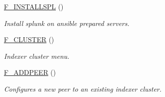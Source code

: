 \begin{DoxyCompactItemize}
\mbox{\hyperlink{ansible__engine_8sh_a9568fd1ead2b71b897b08920e10845a5}{F\+\_\+\+I\+N\+S\+T\+A\+L\+L\+S\+PL}} ()
\begin{DoxyCompactList}\small\item\em Install splunk on ansible prepared servers. \end{DoxyCompactList}\item 
\mbox{\hyperlink{ansible__engine_8sh_a404f494374c78e96b2638ab4b727a158}{F\+\_\+\+C\+L\+U\+S\+T\+ER}} ()
\begin{DoxyCompactList}\small\item\em Indexer cluster menu. \end{DoxyCompactList}\item 
\mbox{\hyperlink{ansible__engine_8sh_ad8cc58f72a5560d0ae9e41b78ac63baf}{F\+\_\+\+A\+D\+D\+P\+E\+ER}} ()
\begin{DoxyCompactList}\small\item\em Configures a new peer to an existing indexer cluster. \end{DoxyCompactList}\end{DoxyCompactItemize}
